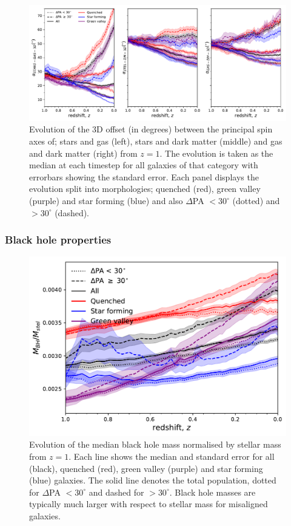 \documentclass[fleqn,usenatbib]{mnras}
\begin{document}
\begin{figure}
	\includegraphics[width=\linewidth]{tng_results/3D_pa_evo.pdf}
    \caption{Evolution of the 3D offset (in degrees) between the principal spin axes of; stars and gas (left), stars and dark matter (middle) and gas and dark matter (right) from $z=1$. The evolution is taken as the median at each timestep for all galaxies of that category with errorbars showing the standard error. Each panel displays the evolution split into morphologies; quenched (red), green valley (purple) and star forming (blue) and also $\Delta$PA $< 30^{\circ}$ (dotted) and $> 30^{\circ}$ (dashed).}
    \label{fig:3D_alpha_evo}
\end{figure}

\subsubsection{Black hole properties}

\begin{figure}
	\includegraphics[width=\linewidth]{tng_results/BH_mass_timestep_norm.pdf}
    \caption{Evolution of the median black hole mass normalised by stellar mass from $z=1$. Each line shows the median and standard error for all (black), quenched (red), green valley (purple) and star forming (blue) galaxies. The solid line denotes the total population, dotted for $\Delta$PA $< 30^{\circ}$ and dashed for $> 30^{\circ}$. Black hole masses are typically much larger with respect to stellar mass for misaligned galaxies.}
    \label{fig:BH_mass}
\end{figure}
\end{document}
